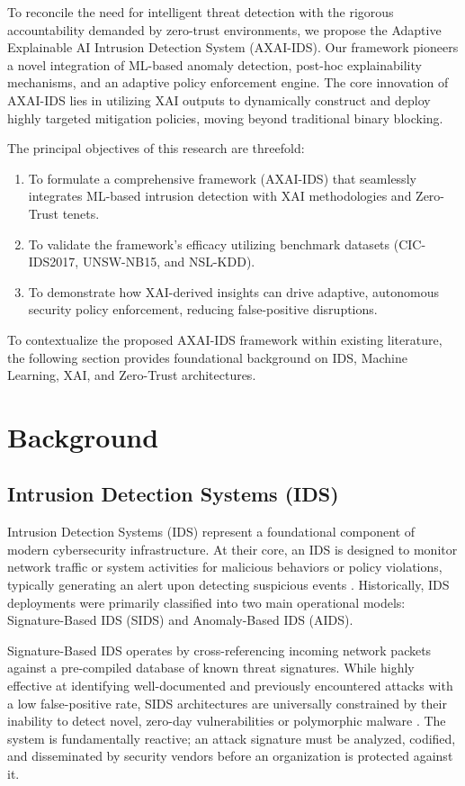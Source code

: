 \documentclass[conference]{IEEEtran}
\begin{document}
To reconcile the need for intelligent threat detection with the rigorous accountability demanded by zero-trust environments, we propose the Adaptive Explainable AI Intrusion Detection System (AXAI-IDS). Our framework pioneers a novel integration of ML-based anomaly detection, post-hoc explainability mechanisms, and an adaptive policy enforcement engine. The core innovation of AXAI-IDS lies in utilizing XAI outputs to dynamically construct and deploy highly targeted mitigation policies, moving beyond traditional binary blocking.

The principal objectives of this research are threefold:
\begin{enumerate}
\item To formulate a comprehensive framework (AXAI-IDS) that seamlessly integrates ML-based intrusion detection with XAI methodologies and Zero-Trust tenets.
\item To validate the framework's efficacy utilizing benchmark datasets (CIC-IDS2017, UNSW-NB15, and NSL-KDD).
\item To demonstrate how XAI-derived insights can drive adaptive, autonomous security policy enforcement, reducing false-positive disruptions.
\end{enumerate}

To contextualize the proposed AXAI-IDS framework within existing literature, the following section provides foundational background on IDS, Machine Learning, XAI, and Zero-Trust architectures.

\section{Background}

\subsection{Intrusion Detection Systems (IDS)}
Intrusion Detection Systems (IDS) represent a foundational component of modern cybersecurity infrastructure. At their core, an IDS is designed to monitor network traffic or system activities for malicious behaviors or policy violations, typically generating an alert upon detecting suspicious events \cite{sharafaldin2018toward}. Historically, IDS deployments were primarily classified into two main operational models: Signature-Based IDS (SIDS) and Anomaly-Based IDS (AIDS).

Signature-Based IDS operates by cross-referencing incoming network packets against a pre-compiled database of known threat signatures. While highly effective at identifying well-documented and previously encountered attacks with a low false-positive rate, SIDS architectures are universally constrained by their inability to detect novel, zero-day vulnerabilities or polymorphic malware \cite{moustafa2015unsw}. The system is fundamentally reactive; an attack signature must be analyzed, codified, and disseminated by security vendors before an organization is protected against it.
\end{document}
